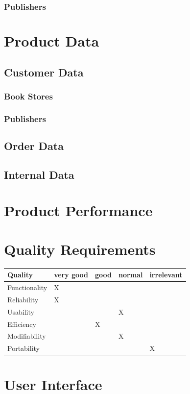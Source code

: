 \documentclass[11pt,a4paper,oneside,svgnames]{report}
\begin{document}
\subsection{Publishers}

\chapter{Product Data}
\section{Customer Data}
\subsection{Book Stores}
\subsection{Publishers}
\section{Order Data}
\section{Internal Data}

\chapter{Product Performance}
\chapter{Quality Requirements}
\begin{table}[h!]
 \begin{tabular}{lllll}
  \hline
  Quality & very good & good & normal & irrelevant \\
  \hline
  Functionality & X & & & \\
  Reliability & X & & & \\
  Usability & & & X & \\
  Efficiency & & X & & \\
  Modifiability & & & X & \\
  Portability & & & & X \\
  \hline
 \end{tabular}
\end{table}

\chapter{User Interface}
\end{document}
